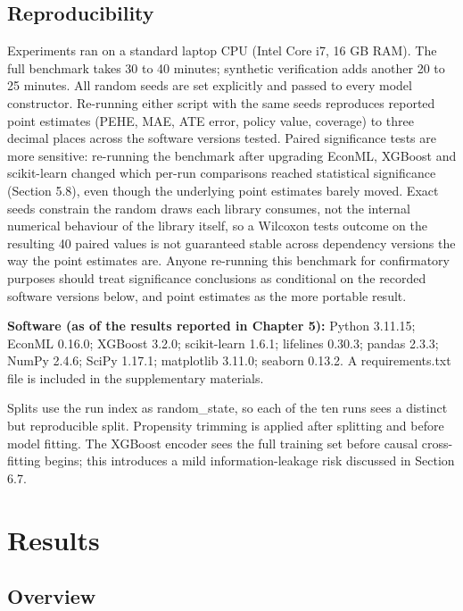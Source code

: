 \section{Reproducibility}\label{reproducibility}

Experiments ran on a standard laptop CPU (Intel Core i7, 16 GB RAM). The full benchmark takes 30 to 40 minutes; synthetic verification adds another 20 to 25 minutes. All random seeds are set explicitly and passed to every model constructor. Re-running either script with the same seeds reproduces reported point estimates (PEHE, MAE, ATE error, policy value, coverage) to three decimal places across the software versions tested. Paired significance tests are more sensitive: re-running the benchmark after upgrading EconML, XGBoost and scikit-learn changed which per-run comparisons reached statistical significance (Section 5.8), even though the underlying point estimates barely moved. Exact seeds constrain the random draws each library consumes, not the internal numerical behaviour of the library itself, so a Wilcoxon test\textquotesingle s outcome on the resulting 40 paired values is not guaranteed stable across dependency versions the way the point estimates are. Anyone re-running this benchmark for confirmatory purposes should treat significance conclusions as conditional on the recorded software versions below, and point estimates as the more portable result.

\textbf{Software (as of the results reported in Chapter 5):} Python 3.11.15; EconML 0.16.0; XGBoost 3.2.0; scikit-learn 1.6.1; lifelines 0.30.3; pandas 2.3.3; NumPy 2.4.6; SciPy 1.17.1; matplotlib 3.11.0; seaborn 0.13.2. A requirements.txt file is included in the supplementary materials.

Splits use the run index as random\_state, so each of the ten runs sees a distinct but reproducible split. Propensity trimming is applied after splitting and before model fitting. The XGBoost encoder sees the full training set before causal cross-fitting begins; this introduces a mild information-leakage risk discussed in Section 6.7.

\chapter{Results}\label{results}

\section{Overview}\label{overview}

